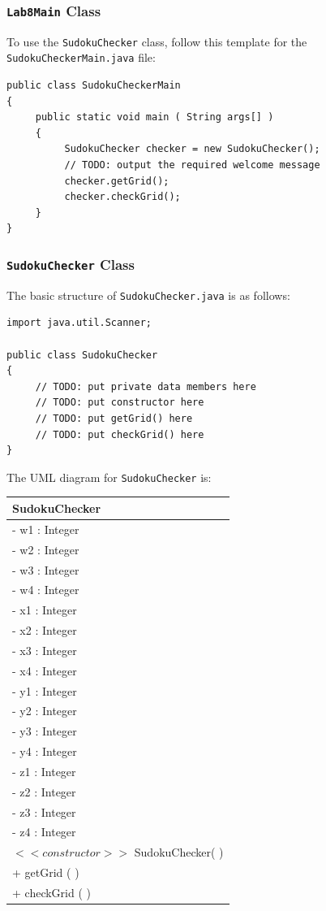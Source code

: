 \subsubsection*{{\tt Lab8Main} Class}

To use the {\tt SudokuChecker} class, follow this template for the {\tt SudokuCheckerMain.java} file:
\begin{verbatim}
public class SudokuCheckerMain
{
     public static void main ( String args[] )
     {
          SudokuChecker checker = new SudokuChecker();
          // TODO: output the required welcome message
          checker.getGrid();
          checker.checkGrid();
     }
}
\end{verbatim}

\subsubsection*{{\tt SudokuChecker} Class}

\noindent The basic structure of {\tt SudokuChecker.java} is as follows:
\begin{verbatim}
import java.util.Scanner;

public class SudokuChecker
{
     // TODO: put private data members here
     // TODO: put constructor here
     // TODO: put getGrid() here
     // TODO: put checkGrid() here
}
\end{verbatim}
The UML diagram for {\tt SudokuChecker} is:
\begin{tabular}{|l|}
\hline
\textbf{SudokuChecker} \\
\hline
- w1 : Integer\\
- w2 : Integer\\
- w3 : Integer\\
- w4 : Integer\\
- x1 : Integer\\
- x2 : Integer\\
- x3 : Integer\\
- x4 : Integer\\
- y1 : Integer\\
- y2 : Integer\\
- y3 : Integer\\
- y4 : Integer\\
- z1 : Integer\\
- z2 : Integer\\
- z3 : Integer\\
- z4 : Integer\\
\hline
$<<constructor>>$ SudokuChecker( )\\
\hline
+ getGrid ( )\\
+ checkGrid ( )\\
\hline
\end{tabular}

